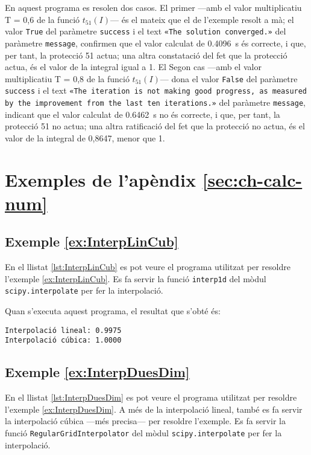 En aquest programa es resolen dos casos. El primer ---amb el valor multiplicatiu T = 0,6 de la funció $t_{51}(I)$--- és el mateix que el de l'exemple resolt a mà; el valor \texttt{True} del paràmetre \texttt{success} i el text  \texttt{«The solution converged.»} del paràmetre \texttt{message}, confirmen que el valor calculat de \qty{0,4096}{s} és correcte, i que, per tant, la protecció 51 actua; una altra constatació del fet que la protecció actua, és el valor de la integral igual a 1. El Segon cas ---amb el valor multiplicatiu T = 0,8 de la funció $t_{51}(I)$--- dona el valor \texttt{False} del paràmetre \texttt{success} i el text  \texttt{«The iteration is not making good progress, as measured by the improvement from the last ten iterations.»} del paràmetre \texttt{message}, indicant que el valor calculat de \qty{0,6462}{s} no és correcte, i que, per tant, la protecció 51 no actua; una altra ratificació del fet que la protecció no actua, és el valor de la integral de 0,8647, menor que 1. 


\section{Exemples de l'apèndix \ref*{sec:ch-calc-num}}

\hypertarget{exemple:InterpLinCub}{\subsection{Exemple \ref*{ex:InterpLinCub} \InterpLinCub}}
En el llistat \vref{lst:InterpLinCub} es pot veure el programa utilitzat per resoldre l'exemple \vref{ex:InterpLinCub}. Es fa servir la funció \texttt{interp1d} del mòdul \texttt{scipy.interpolate} per fer la interpolació.





Quan s'executa aquest programa, el resultat que s'obté és:
\lstset{
	language=,
	numbers=none,
	frame=none
}
\begin{lstlisting}
Interpolació lineal: 0.9975
Interpolació cúbica: 1.0000
\end{lstlisting} 


\hypertarget{exemple:InterpDuesDim}{\subsection{Exemple \ref*{ex:InterpDuesDim} \InterpDuesDim}}
En el llistat \vref{lst:InterpDuesDim} es pot veure el programa utilitzat per resoldre l'exemple \vref{ex:InterpDuesDim}. A més de la interpolació lineal, també es fa servir la interpolació cúbica ---més precisa--- per resoldre l'exemple. Es fa servir la funció \texttt{RegularGridInterpolator} del mòdul \texttt{scipy.interpolate} per fer la interpolació.



